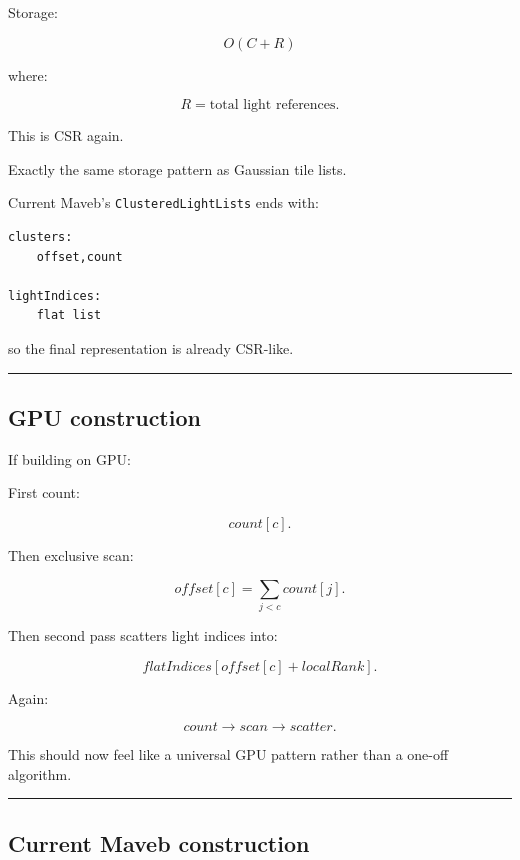 Storage:

\[
O(C+R)
\]

where:

\[
R=
\text{total light references}.
\]

This is CSR again.

Exactly the same storage pattern as Gaussian tile lists.

Current Maveb's \texttt{ClusteredLightLists} ends with:

\begin{verbatim}
clusters:
    offset,count

lightIndices:
    flat list
\end{verbatim}

so the final representation is already CSR-like.

\begin{center}\rule{0.5\linewidth}{0.5pt}\end{center}

\subsection{GPU construction}\label{04-visual-computing-ii-ch040-gpu-construction}

\hypertarget{04-visual-computing-ii-ch040-gpu-construction}{}

If building on GPU:

First count:

\[
count[c].
\]

Then exclusive scan:

\[
offset[c]
=
\sum_{j<c}count[j].
\]

Then second pass scatters light indices into:

\[
flatIndices[
offset[c]+localRank
].
\]

Again:

\[
\boxed{
count
\rightarrow
scan
\rightarrow
scatter.
}
\]

This should now feel like a universal GPU pattern rather than a one-off algorithm.

\begin{center}\rule{0.5\linewidth}{0.5pt}\end{center}

\subsection{Current Maveb construction}\label{04-visual-computing-ii-ch040-current-maveb-construction}

